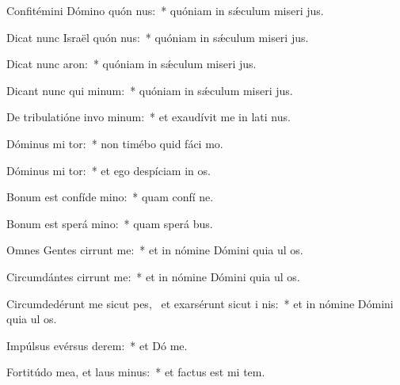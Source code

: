 \item Confitémini Dómino quón nus:~* quóniam in sǽculum miseri jus.
\item Dicat nunc Israël quón nus:~* quóniam in sǽculum miseri jus.
\item Dicat nunc  aron:~* quóniam in sǽculum miseri jus.
\item Dicant nunc qui  minum:~* quóniam in sǽculum miseri jus.
\item De tribulatióne invo minum:~* et exaudívit me in lati nus.
\item Dóminus mi tor:~* non timébo quid fáci  mo.
\item Dóminus mi tor:~* et ego despíciam in os.
\item Bonum est confíde  mino:~* quam confí  ne.
\item Bonum est sperá  mino:~* quam sperá  bus.
\item Omnes Gentes cirrunt me:~* et in nómine Dómini quia ul   os.
\item Circumdántes cirrunt me:~* et in nómine Dómini quia ul   os.
\item Circumdedérunt me sicut pes,~\pscross{} et exarsérunt sicut i  nis:~* et in nómine Dómini quia ul   os.
\item Impúlsus evérsus   derem:~* et Dó  me.
\item Fortitúdo mea, et laus  minus:~* et factus est mi  tem.
